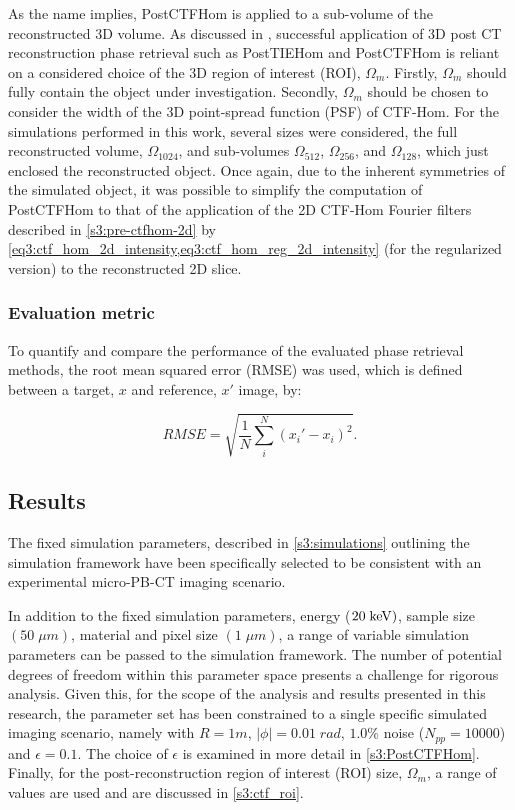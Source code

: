 \documentclass[twocolumn, switch]{article} %
\begin{document}
As the name implies, PostCTFHom is applied to a sub-volume of the reconstructed 3D volume. As discussed in \cite{Thompson2019FastTomography}, successful application of 3D post CT reconstruction phase retrieval such as PostTIEHom and PostCTFHom is reliant on a considered choice of the 3D region of interest (ROI), ${\Omega _m}$. Firstly, ${\Omega _m}$ should fully contain the object under investigation. Secondly, ${\Omega _m}$ should be chosen to consider the width of the 3D point-spread function (PSF) of CTF-Hom. For the simulations performed in this work, several sizes were considered, the full reconstructed volume, ${\Omega _{1024}}$, and sub-volumes ${\Omega _{512}}$, ${\Omega _{256}}$, and ${\Omega _{128}}$, which just enclosed the reconstructed object.
Once again, due to the inherent symmetries of the simulated object, it was possible to simplify the computation of PostCTFHom to that of the application of the 2D CTF-Hom Fourier filters described in \cref{s3:pre-ctfhom-2d} by \cref{eq3:ctf_hom_2d_intensity,eq3:ctf_hom_reg_2d_intensity} (for the regularized version) to the reconstructed 2D slice.

\subsubsection{Evaluation metric} \label{s3:ctf_evaluation_metrics}

To quantify and compare the performance of the evaluated phase retrieval methods, the root mean squared error (RMSE) was used, which is defined between a target, $x$ and reference, $x'$ image, by:

\begin{equation}
    \label{eq3:rmse}
    RMSE = \sqrt{\frac{1}{N}{\sum_{i}^{N}{\left(x_i'-x_i\right)^2}}}.
\end{equation}

\subsection{Results}\label{s3:results}

The fixed simulation parameters, described in \cref{s3:simulations} outlining the simulation framework have been specifically selected to be consistent with an experimental micro-PB-CT imaging scenario.  

In addition to the fixed simulation parameters,  energy ($20\;{\rm{keV}})$, sample size $(50\;\mu m)$, material and pixel size $(1\;\mu m)$, a range of variable simulation parameters can be passed to the simulation framework. The number of potential degrees of freedom within this parameter space presents a challenge for rigorous analysis. Given this, for the scope of the analysis and results presented in this research, the parameter set has been constrained to a single specific simulated imaging scenario, namely with $R=1m$, $|\phi|=0.01\;rad$, $1.0\%$ noise ($N_{pp} = 10000$) and $\epsilon=0.1$. The choice of $\epsilon$ is examined in more detail in \cref{s3:PostCTFHom}. Finally, for the post-reconstruction region of interest (ROI) size, ${\Omega _m}$, a range of values are used and are discussed in \cref{s3:ctf_roi}.
\end{document}
